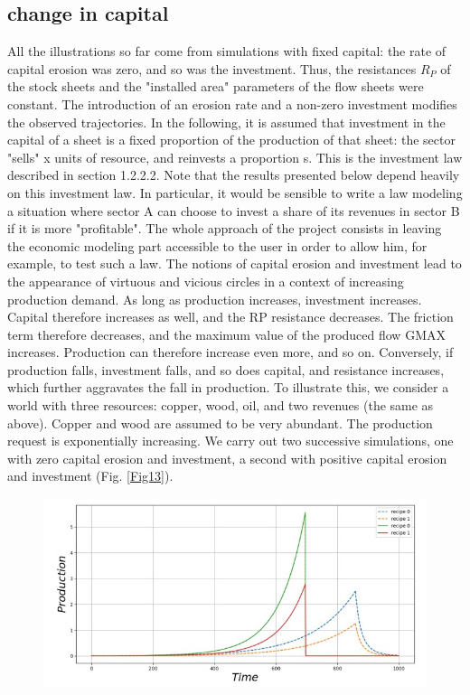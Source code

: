 \documentclass[12pt,a4paper]{article}%
\begin{document}
\begin{appendix}
\subsection{change in capital} 
All the illustrations so far come from simulations with fixed capital: the rate of capital erosion was zero, and so was the investment. Thus, the resistances $R_{P}$ of the stock sheets and the "installed area" parameters of the flow sheets were constant. The introduction of an erosion rate and a non-zero investment modifies the observed trajectories.  In the following, it is assumed that investment in the capital of a sheet is a fixed proportion of the production of that sheet: the sector "sells" x units of resource, and reinvests a proportion s. This is the investment law described in section 1.2.2.2. Note that the results presented below depend heavily on this investment law. In particular, it would be sensible to write a law modeling a situation where sector A can choose to invest a share of its revenues in sector B if it is more "profitable". The whole approach of the project consists in leaving the economic modeling part accessible to the user in order to allow him, for example, to test such a law.  The notions of capital erosion and investment lead to the appearance of virtuous and vicious circles in a context of increasing production demand.  As long as production increases, investment increases. Capital therefore increases as well, and the RP resistance decreases. The friction term therefore decreases, and the maximum value of the produced flow GMAX increases. Production can therefore increase even more, and so on.  Conversely, if production falls, investment falls, and so does capital, and resistance increases, which further aggravates the fall in production.  To illustrate this, we consider a world with three resources: copper, wood, oil, and two revenues (the same as above). Copper and wood are assumed to be very abundant. The production request is exponentially increasing. We carry out two successive simulations, one with zero capital erosion and investment, a second with positive capital erosion and investment (Fig. \ref{Fig13}).  
\begin{figure}[h] 
	\centering \includegraphics[width=1.0\textwidth]{figures/Production13.jpg}

\end{figure}
\end{appendix}
\end{document}
